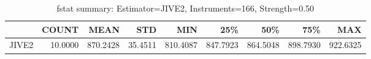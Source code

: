 \begin{table}[ht]
\centering
\caption{fstat summary: Estimator=JIVE2, Instruments=166, Strength=0.50}
\begin{tabular}{lrrrrrrrr}
\toprule
 & COUNT & MEAN & STD & MIN & 25\% & 50\% & 75\% & MAX \\
\midrule
JIVE2 & 10.0000 & 870.2428 & 35.4511 & 810.4087 & 847.7923 & 864.5048 & 898.7930 & 922.6325 \\
\bottomrule
\end{tabular}
\end{table}
